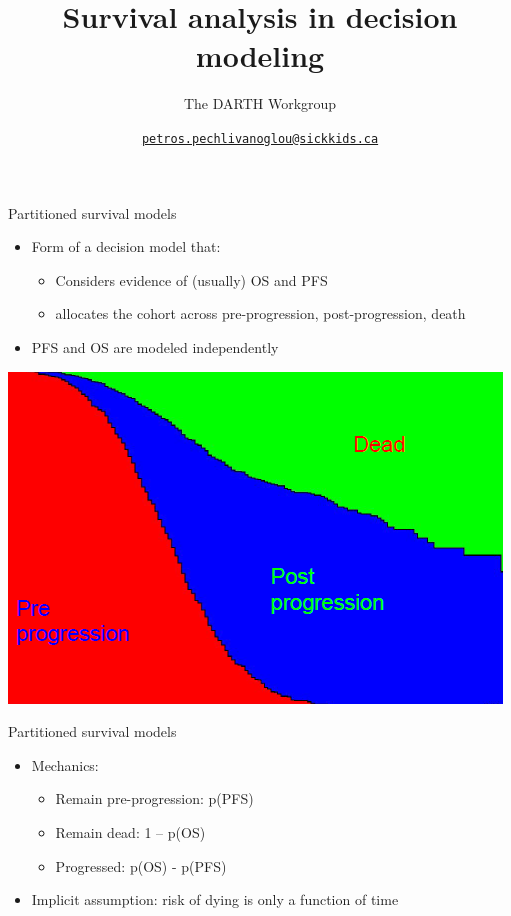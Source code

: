 \documentclass[
  ignorenonframetext,
]{beamer}
\title{Survival analysis in decision modeling}
\subtitle{The DARTH Workgroup}
\author{\href{mailto:petros.pechlivanoglou@sickkids.ca}{\nolinkurl{petros.pechlivanoglou@sickkids.ca}}}
\date{}
\providecommand{\tightlist}{%
  \setlength{\itemsep}{0pt}\setlength{\parskip}{0pt}}
\begin{document}
\frame{\titlepage}

\begin{frame}

\end{frame}

\begin{frame}{Partitioned survival models}
\protect\hypertarget{partitioned-survival-models}{}

\begin{itemize}
\tightlist
\item
  Form of a decision model that:

  \begin{itemize}
  \tightlist
  \item
    Considers evidence of (usually) OS and PFS
  \item
    allocates the cohort across pre-progression, post-progression, death
  \end{itemize}
\item
  PFS and OS are modeled independently
\end{itemize}

\end{frame}

\begin{frame}

\includegraphics[width=1\linewidth]{figures/psm}

\end{frame}

\begin{frame}{Partitioned survival models}
\protect\hypertarget{partitioned-survival-models-1}{}

\begin{itemize}
\tightlist
\item
  Mechanics:

  \begin{itemize}
  \tightlist
  \item
    Remain pre-progression: p(PFS)
  \item
    Remain dead: 1 -- p(OS)
  \item
    Progressed: p(OS) - p(PFS)
  \end{itemize}
\item
  Implicit assumption: risk of dying is only a function of time
\end{itemize}

\end{frame}
\end{document}

